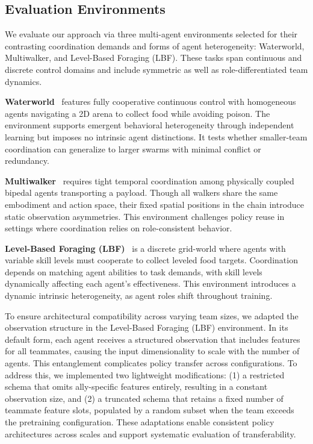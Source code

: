 \subsection{Evaluation Environments} 

We evaluate our approach via three multi-agent environments selected for their contrasting 
coordination demands and forms of agent heterogeneity: 
Waterworld, Multiwalker, and Level-Based Foraging (LBF). These tasks span continuous 
and discrete control domains and include symmetric as well as role-differentiated team dynamics.

\textbf{Waterworld}~\cite{gupta2017} features fully cooperative continuous control 
with homogeneous agents navigating a 2D arena to collect food while avoiding poison. 
The environment supports emergent behavioral heterogeneity through independent learning 
but imposes no intrinsic agent distinctions. It tests whether smaller-team coordination 
can generalize to larger swarms with minimal conflict or redundancy.

\textbf{Multiwalker}~\cite{gupta2017} requires tight temporal coordination among physically 
coupled bipedal agents transporting a payload. Though all walkers share the same embodiment 
and action space, their fixed spatial positions in the chain introduce static observation 
asymmetries. This environment challenges policy reuse in settings where coordination relies 
on role-consistent behavior.

\textbf{Level-Based Foraging (LBF)}~\cite{papoudakis2021} is a discrete grid-world where 
agents with variable skill levels must cooperate to collect leveled food targets. 
Coordination depends on matching agent abilities to task demands, with skill levels 
dynamically affecting each agent's effectiveness. This environment introduces a dynamic 
intrinsic heterogeneity, as agent roles shift throughout training.

To ensure architectural compatibility across varying team sizes, we adapted the observation 
structure in the Level-Based Foraging (LBF) environment. In its default form, 
each agent receives a structured observation that includes features for all teammates, 
causing the input dimensionality to scale with the number of agents. 
This entanglement complicates policy transfer across configurations. 
To address this, we implemented two lightweight modifications: 
(1) a restricted schema that omits ally-specific features entirely, 
resulting in a constant observation size, and 
(2) a truncated schema that retains a fixed number of teammate feature slots, 
populated by a random subset when the team exceeds the pretraining configuration. 
These adaptations enable consistent policy architectures across scales and support 
systematic evaluation of transferability.

